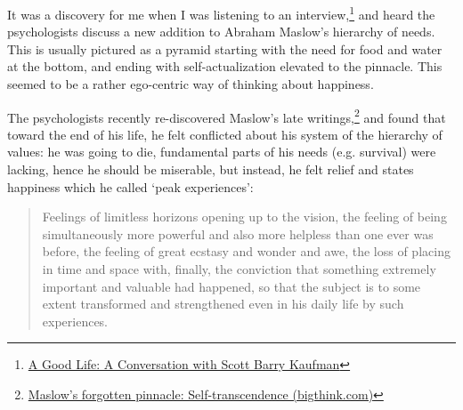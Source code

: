 It was a discovery for me when I was listening to an
interview,\footnote{\href{https://www.samharris.org/podcasts/making-sense-episodes/209-a-good-life}{A
  Good Life: A Conversation with Scott Barry Kaufman}} and heard the
psychologists discuss a new addition to Abraham Maslow's hierarchy of
needs. This is usually pictured as a pyramid starting with the need for
food and water at the bottom, and ending with self-actualization
elevated to the pinnacle. This seemed to be a rather ego-centric way of
thinking about happiness.

The psychologists recently re-discovered Maslow's late
writings,\footnote{\href{https://bigthink.com/neuropsych/maslow-self-transcendence/}{Maslow's
  forgotten pinnacle: Self-transcendence (bigthink.com)}} and found that
toward the end of his life, he felt conflicted about his system of the
hierarchy of values: he was going to die, fundamental parts of his needs
(e.g. survival) were lacking, hence he should be miserable, but instead,
he felt relief and states happiness which he called `peak experiences':

\begin{quote}
Feelings of limitless horizons opening up to the vision, the feeling of
being simultaneously more powerful and also more helpless than one ever
was before, the feeling of great ecstasy and wonder and awe, the loss of
placing in time and space with, finally, the conviction that something
extremely important and valuable had happened, so that the subject is to
some extent transformed and strengthened even in his daily life by such
experiences.
\end{quote}

\clearpage
\figurepagelayout

